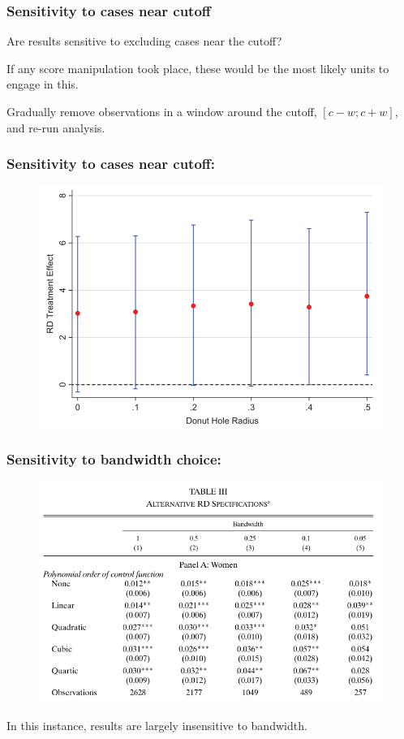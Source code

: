 \documentclass[12pt,english,dvipsnames,aspectratio=169,handout]{beamer}\usepackage[]{graphicx}\usepackage[]{xcolor}
\begin{document}
\begin{frame}
\frametitle{Sensitivity to cases near cutoff}
Are results sensitive to excluding cases near the cutoff?\bigskip
\pause

If any score manipulation took place, these would be the most likely units to engage in this.\bigskip
\pause

Gradually remove observations in a window around the cutoff, $[c-w; c+w]$, and re-run analysis.

\end{frame}


\begin{frame}
\frametitle{Sensitivity to cases near cutoff: }

\begin{figure}
\centering
\includegraphics[scale=0.35]{../04-figures/07/16.PNG}
\caption{\cite{cattaneo_practical_2019}}
\end{figure}

\end{frame}


\begin{frame}
\frametitle{Sensitivity to bandwidth choice: }

\begin{figure}
\centering
\includegraphics[scale=0.4]{../04-figures/07/17.PNG}
\end{figure}

In this instance, results are largely insensitive to bandwidth.

\end{frame}
\end{document}
